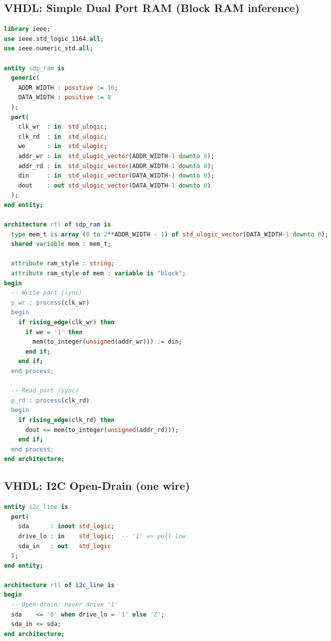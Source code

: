 \documentclass[10pt,a4paper]{article}
\begin{document}
\begin{multicols}{3}
\subsection{VHDL: Simple Dual Port RAM (Block RAM inference)}
\begin{lstlisting}[language=VHDL,emph={generic,ADDR_WIDTH,DATA_WIDTH,ram_style,process,rising_edge,shared,to_integer,unsigned},emphstyle=\bfseries\color{codeemph}]
library ieee;
use ieee.std_logic_1164.all;
use ieee.numeric_std.all;

entity sdp_ram is
  generic(
    ADDR_WIDTH : positive := 16;
    DATA_WIDTH : positive := 8
  );
  port(
    clk_wr  : in  std_ulogic;
    clk_rd  : in  std_ulogic;
    we      : in  std_ulogic;
    addr_wr : in  std_ulogic_vector(ADDR_WIDTH-1 downto 0);
    addr_rd : in  std_ulogic_vector(ADDR_WIDTH-1 downto 0);
    din     : in  std_ulogic_vector(DATA_WIDTH-1 downto 0);
    dout    : out std_ulogic_vector(DATA_WIDTH-1 downto 0)
  );
end entity;

architecture rtl of sdp_ram is
  type mem_t is array (0 to 2**ADDR_WIDTH - 1) of std_ulogic_vector(DATA_WIDTH-1 downto 0);
  shared variable mem : mem_t;

  attribute ram_style : string;
  attribute ram_style of mem : variable is "block";
begin
  -- Write port (sync)
  p_wr : process(clk_wr)
  begin
    if rising_edge(clk_wr) then
      if we = '1' then
        mem(to_integer(unsigned(addr_wr))) := din;
      end if;
    end if;
  end process;

  -- Read port (sync)
  p_rd : process(clk_rd)
  begin
    if rising_edge(clk_rd) then
      dout <= mem(to_integer(unsigned(addr_rd)));
    end if;
  end process;
end architecture;
\end{lstlisting}

\subsection{VHDL: I2C Open-Drain (one wire)}
\begin{lstlisting}[language=VHDL,emph={inout,'Z',process},emphstyle=\bfseries\color{codeemph}]
entity i2c_line is
  port(
    sda      : inout std_logic;
    drive_lo : in    std_logic;  -- '1' => pull low
    sda_in   : out   std_logic
  );
end entity;

architecture rtl of i2c_line is
begin
  -- Open-drain: never drive '1'
  sda    <= '0' when drive_lo = '1' else 'Z';
  sda_in <= sda;
end architecture;
\end{lstlisting}


\end{multicols}
\end{document}
